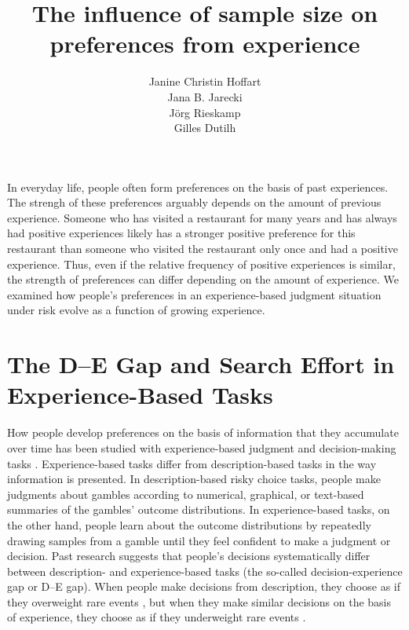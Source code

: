 \documentclass[a4paper, man, natbib, floatsintext]{apa6} %
\title{The influence of sample size on preferences from experience}
\author{Janine Christin Hoffart\\Jana B. Jarecki\\J\"org Rieskamp\\Gilles Dutilh}
\affiliation{University of Basel, Department of Psychology, Center for Economic Psychology}
\begin{document}
\maketitle

In everyday life, people often form preferences on the basis of past experiences. The strengh of these preferences arguably depends on the amount of previous experience. Someone who has visited a restaurant for many years and has always had positive experiences likely has a stronger positive preference for this restaurant than someone who visited the restaurant only once and had a positive experience. Thus, even if the relative frequency of positive experiences is similar, the strength of preferences can differ depending on the amount of experience. We examined how people's preferences in an experience-based judgment situation under risk evolve as a function of growing experience. 


\section{The D--E Gap and Search Effort in Experience-Based Tasks}
How people develop preferences on the basis of information that they accumulate over time has been studied with experience-based judgment and decision-making tasks \citep[e.g.,][]{Hertwig2004, Hau2008}. Experience-based tasks differ from description-based tasks in the way information is presented. In description-based risky choice tasks, people make judgments about gambles according to numerical, graphical, or text-based summaries of the gambles' outcome distributions. In experience-based tasks, on the other hand, people learn about the outcome distributions by repeatedly drawing samples from a gamble until they feel confident to make a judgment or decision. Past research suggests that people's decisions systematically differ between description- and experience-based tasks (the so-called decision-experience gap or D--E gap). When people make decisions from description, they choose as if they overweight rare events \citep{Kahneman1979}, but when they make similar decisions on the basis of experience, they choose as if they underweight rare events \citep{Hertwig2004}. 
\end{document}
